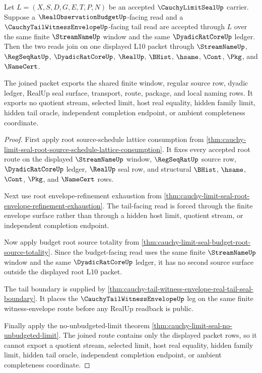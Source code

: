 \begin{theorem}
\label{thm:cauchy-limit-seal-budget-tail-root-join}
Let $L=(X,S,D,G,E,T,P,N)$ be an accepted $\CauchyLimitSealUp$ carrier. Suppose a $\RealObservationBudgetUp$-facing read and a $\CauchyTailWitnessEnvelopeUp$-facing tail read are accepted through $L$ over the same finite $\StreamNameUp$ window and the same $\DyadicRatCoreUp$ ledger. Then the two reads join on one displayed L10 packet through $\StreamNameUp$, $\RegSeqRatUp$, $\DyadicRatCoreUp$, $\RealUp$, $\BHist$, $\hsame$, $\Cont$, $\Pkg$, and $\NameCert$.

The joined packet exports the shared finite window, regular source row, dyadic ledger, RealUp seal surface, transport, route, package, and local naming rows. It exports no quotient stream, selected limit, host real equality, hidden family limit, hidden tail oracle, independent completion endpoint, or ambient completeness coordinate.
\end{theorem}
\begin{proof}
First apply root source-schedule lattice consumption from \autoref{thm:cauchy-limit-seal-root-source-schedule-lattice-consumption}. It fixes every accepted root route on the displayed $\StreamNameUp$ window, $\RegSeqRatUp$ source row, $\DyadicRatCoreUp$ ledger, $\RealUp$ seal row, and structural $\BHist$, $\hsame$, $\Cont$, $\Pkg$, and $\NameCert$ rows.

Next use root envelope-refinement exhaustion from \autoref{thm:cauchy-limit-seal-root-envelope-refinement-exhaustion}. The tail-facing read is forced through the finite envelope surface rather than through a hidden host limit, quotient stream, or independent completion endpoint.

Now apply budget root source totality from \autoref{thm:cauchy-limit-seal-budget-root-source-totality}. Since the budget-facing read uses the same finite $\StreamNameUp$ window and the same $\DyadicRatCoreUp$ ledger, it has no second source surface outside the displayed root L10 packet.

The tail boundary is supplied by \autoref{thm:cauchy-tail-witness-envelope-real-tail-seal-boundary}. It places the $\CauchyTailWitnessEnvelopeUp$ leg on the same finite witness-envelope route before any RealUp readback is public.

Finally apply the no-unbudgeted-limit theorem \autoref{thm:cauchy-limit-seal-no-unbudgeted-limit}. The joined route contains only the displayed packet rows, so it cannot export a quotient stream, selected limit, host real equality, hidden family limit, hidden tail oracle, independent completion endpoint, or ambient completeness coordinate.
\end{proof}

